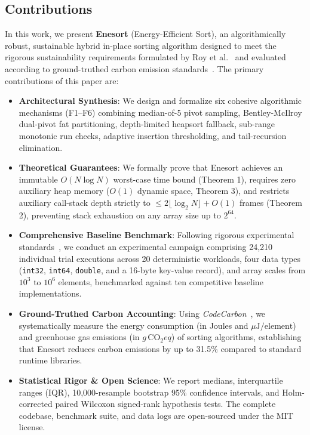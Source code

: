 \documentclass[journal]{IEEEtran}
\begin{document}
\subsection{Contributions}
In this work, we present \textbf{Enesort} (Energy-Efficient Sort), an algorithmically robust, sustainable hybrid in-place sorting algorithm designed to meet the rigorous sustainability requirements formulated by Roy et al.~\cite{roy2026taxonomy} and evaluated according to ground-truthed carbon emission standards~\cite{codecarbon2025groundtruthing,schmidt2021codecarbon}. The primary contributions of this paper are:
\begin{itemize}
    \item \textbf{Architectural Synthesis}: We design and formalize six cohesive algorithmic mechanisms (F1--F6) combining median-of-5 pivot sampling, Bentley-McIlroy dual-pivot fat partitioning, depth-limited heapsort fallback, sub-range monotonic run checks, adaptive insertion thresholding, and tail-recursion elimination.
    \item \textbf{Theoretical Guarantees}: We formally prove that Enesort achieves an immutable $O(N \log N)$ worst-case time bound (Theorem 1), requires zero auxiliary heap memory ($O(1)$ dynamic space, Theorem 3), and restricts auxiliary call-stack depth strictly to $\le 2 \lfloor \log_2 N \rfloor + O(1)$ frames (Theorem 2), preventing stack exhaustion on any array size up to $2^{64}$.
    \item \textbf{Comprehensive Baseline Benchmark}: Following rigorous experimental standards~\cite{bylina2025importance,jimenez2025compiler}, we conduct an experimental campaign comprising 24,210 individual trial executions across 20 deterministic workloads, four data types (\texttt{int32}, \texttt{int64}, \texttt{double}, and a 16-byte key-value record), and array scales from $10^3$ to $10^6$ elements, benchmarked against ten competitive baseline implementations.
    \item \textbf{Ground-Truthed Carbon Accounting}: Using \textit{CodeCarbon}~\cite{codecarbon2025groundtruthing,schmidt2021codecarbon}, we systematically measure the energy consumption (in Joules and $\mu\text{J}/\text{element}$) and greenhouse gas emissions (in $g\,\text{CO}_2eq$) of sorting algorithms, establishing that Enesort reduces carbon emissions by up to 31.5\% compared to standard runtime libraries.
    \item \textbf{Statistical Rigor \& Open Science}: We report medians, interquartile ranges (IQR), 10,000-resample bootstrap 95\% confidence intervals, and Holm-corrected paired Wilcoxon signed-rank hypothesis tests. The complete codebase, benchmark suite, and data logs are open-sourced under the MIT license.
\end{itemize}
\end{document}
